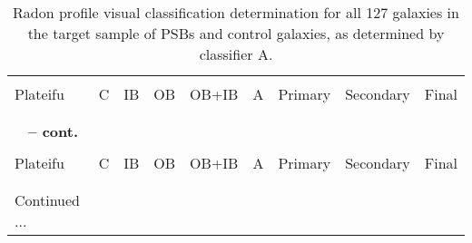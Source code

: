 \begin{longtable}{p{2.1cm}p{0.8cm}p{0.8cm}p{0.8cm}p{0.8cm}p{0.8cm}p{1.5cm}p{1.5cm}p{1.2cm}}
\caption[Radon profile visual classification of PSBs and controls - classifier A]{Radon profile visual classification determination for all 127 galaxies in the target sample of PSBs and control galaxies, as determined by classifier A.}
\label{tab:full-visual-classification} \\

\hline
\\
Plateifu & C & IB & OB & OB+IB & A & Primary & Secondary & Final \\
\\
\hline
\\
\endfirsthead
%
{{\bfseries \tablename\ \thetable{} -- cont.}}
\\
\hline
\\
Plateifu & C & IB & OB & OB+IB & A & Primary & Secondary & Final \\
\\
\hline
\\
\endhead

\hline 
{{Continued ...}}
\endfoot
\hline
\endlastfoot


\end{longtable}
